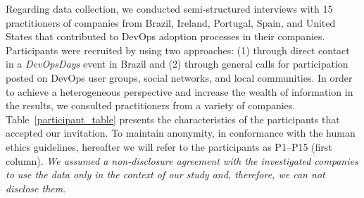 Regarding data collection, we conducted semi-structured interviews with 15 practitioners of companies from
Brazil, Ireland, Portugal, Spain, and United States that
contributed to DevOps adoption processes in their companies. Participants
were recruited by using two approaches: (1) through direct contact in a \emph{DevOpsDays}
event in Brazil and (2) through general
calls for participation posted on DevOps user groups, social networks,
and local communities. In order to achieve a heterogeneous perspective
and increase the wealth of information in the results,
we consulted practitioners from a variety of companies.
Table~\ref{participant_table} presents the characteristics of the participants
that accepted our invitation.
To maintain anonymity, in conformance with the human ethics guidelines,
hereafter we will refer to the participants as P1--P15 (first column). \emph{We
assumed a non-disclosure agreement with the investigated companies to use the
data only in the context of our study and, therefore, we can not disclose them}.


